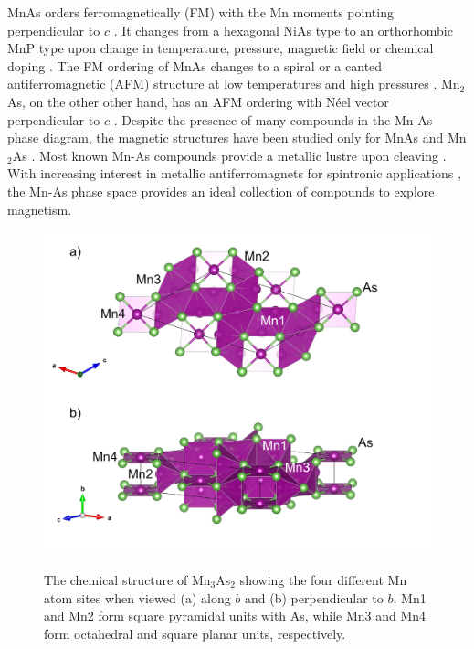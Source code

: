 \documentclass[letterpaper,10pt,doublespacing,edeposit]{uiucthesis2020}
\begin{document}
\begin{mainmatter}
MnAs orders ferromagnetically (FM) with the Mn moments pointing perpendicular to $c$ \cite{Bacon1955}. It changes from a hexagonal NiAs type to an orthorhombic MnP type upon change in temperature, pressure, magnetic field or chemical doping \cite{Glazkov2003,Ishikawa2006,Sirota1971,Pytlik1985,Schwartz1971}. 
The FM ordering of MnAs changes to a spiral or a canted antiferromagnetic (AFM) structure at low temperatures and high pressures \cite{Bacon1955,Andresen1984,Glazkov2003}. 
Mn$_2$As, on the other other hand, has an AFM ordering with N\'eel vector perpendicular to $c$ \cite{Austin1962}.
Despite the presence of many compounds in the Mn-As phase diagram, the magnetic structures have been studied only for MnAs and Mn$_2$As \cite{Bacon1955,Austin1962}.
Most known Mn-As compounds provide a metallic lustre upon cleaving \cite{Hagedorn1995,Hagedorn1994,Dietrich1990,Moller1993}.
With increasing interest in metallic antiferromagnets for spintronic applications \cite{Baltz2018,Siddiqui2020,Jungfleisch2018}, the Mn-As phase space provides an ideal collection of compounds to explore magnetism.

\begin{figure}
\centering\includegraphics[width=0.8\columnwidth]{figures/ch6/monoclinic_Mn3As2_75510.png} \\
\caption{The chemical structure of Mn$_3$As$_2$ showing the four different Mn atom sites when viewed (a) along $b$ and (b) perpendicular to $b$. Mn1 and Mn2 form square pyramidal units with As, while Mn3 and Mn4 form octahedral and square planar units, respectively.
}
\label{fig:Mn3As2_crystal_structure}
\end{figure}



\end{mainmatter}
\end{document}
